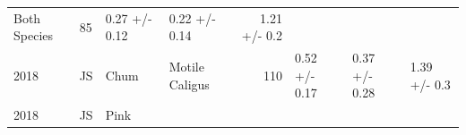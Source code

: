 \documentclass[fleqn,10pt]{wlpeerj} %
\begin{document}
\begin{longtable}[]{@{}llllrlll@{}}
\begin{minipage}[t]{0.11\columnwidth}
Both Species\strut
\end{minipage} & \begin{minipage}[t]{0.04\columnwidth}\raggedleft\strut
85\strut
\end{minipage} & \begin{minipage}[t]{0.14\columnwidth}\raggedright\strut
0.27 +/- 0.12\strut
\end{minipage} & \begin{minipage}[t]{0.14\columnwidth}\raggedright\strut
0.22 +/- 0.14\strut
\end{minipage} & \begin{minipage}[t]{0.14\columnwidth}\raggedright\strut
1.21 +/- 0.2\strut
\end{minipage}\tabularnewline
\begin{minipage}[t]{0.09\columnwidth}\raggedright\strut
2018\strut
\end{minipage} & \begin{minipage}[t]{0.06\columnwidth}\raggedright\strut
JS\strut
\end{minipage} & \begin{minipage}[t]{0.06\columnwidth}\raggedright\strut
Chum\strut
\end{minipage} & \begin{minipage}[t]{0.11\columnwidth}\raggedright\strut
Motile Caligus\strut
\end{minipage} & \begin{minipage}[t]{0.04\columnwidth}\raggedleft\strut
110\strut
\end{minipage} & \begin{minipage}[t]{0.14\columnwidth}\raggedright\strut
0.52 +/- 0.17\strut
\end{minipage} & \begin{minipage}[t]{0.14\columnwidth}\raggedright\strut
0.37 +/- 0.28\strut
\end{minipage} & \begin{minipage}[t]{0.14\columnwidth}\raggedright\strut
1.39 +/- 0.3\strut
\end{minipage}\tabularnewline
\begin{minipage}[t]{0.09\columnwidth}\raggedright\strut
2018\strut
\end{minipage} & \begin{minipage}[t]{0.06\columnwidth}\raggedright\strut
JS\strut
\end{minipage} & \begin{minipage}[t]{0.06\columnwidth}\raggedright\strut
Pink\strut
\end{minipage} & \begin{minipage}[t]{0.11\columnwidth}\raggedright\strut

\end{minipage}
\end{longtable}
\end{document}

